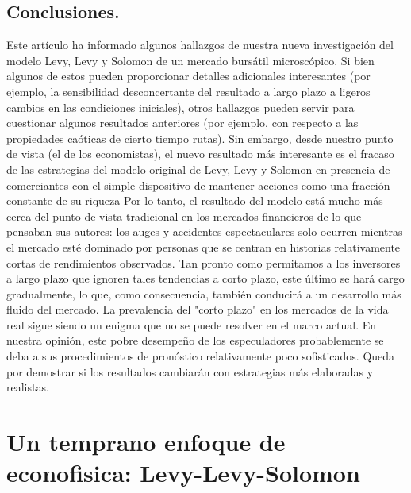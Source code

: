 \documentclass[12pt,a4paper]{article}
\begin{document}
\subsection*{Conclusiones.}
\quad Este artículo ha informado algunos hallazgos de nuestra nueva investigación del modelo Levy, Levy y Solomon de un mercado bursátil microscópico. Si bien algunos de estos pueden proporcionar detalles adicionales interesantes (por ejemplo, la sensibilidad desconcertante del resultado a largo plazo a ligeros cambios en las condiciones iniciales), otros hallazgos pueden servir para cuestionar algunos resultados anteriores (por ejemplo, con respecto a las propiedades caóticas de cierto tiempo rutas). Sin embargo, desde nuestro punto de vista (el de los economistas), el nuevo resultado más interesante es el fracaso de las estrategias del modelo original de Levy, Levy y Solomon en presencia de comerciantes con el simple dispositivo de mantener acciones como una fracción constante de su riqueza Por lo tanto, el resultado del modelo está mucho más cerca del punto de vista tradicional en los mercados financieros de lo que pensaban sus autores: los auges y accidentes espectaculares solo ocurren mientras el mercado esté dominado por personas que se centran en historias relativamente cortas de rendimientos observados. Tan pronto como permitamos a los inversores a largo plazo que ignoren tales tendencias a corto plazo, este último se hará cargo gradualmente, lo que, como consecuencia, también conducirá a un desarrollo más fluido del mercado. La prevalencia del "corto plazo" en los mercados de la vida real sigue siendo un enigma que no se puede resolver en el marco actual. En nuestra opinión, este pobre desempeño de los especuladores probablemente se deba a sus procedimientos de pronóstico relativamente poco sofisticados. Queda por demostrar si los resultados cambiarán con estrategias más elaboradas y realistas.
\newpage
\begin{center}
\citep{Samanidou2007}
\end{center}
\section*{Un temprano enfoque de econofisica: Levy-Levy-Solomon}
\end{document}
